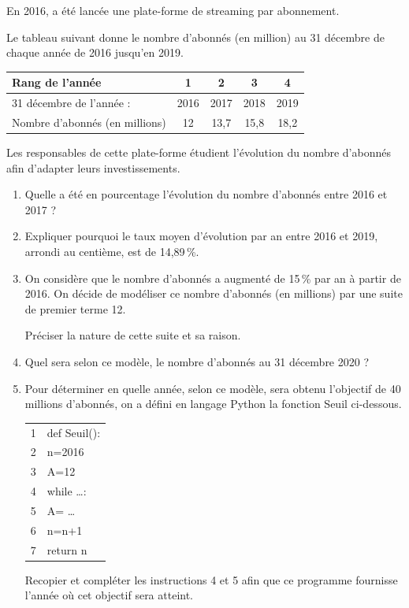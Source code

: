 \medskip

En 2016, a été lancée une plate-forme de streaming par abonnement.

Le tableau suivant donne le nombre d'abonnés (en million) au 31 décembre de
chaque année de 2016 jusqu'en 2019.
\begin{center}
\begin{tabular}[]{|m{4.85cm}|*{4}{c|}}
\hline
Rang de l'année &1& 2& 3 &4\\\hline
31 décembre de l'année :& 2016& 2017& 2018& 2019\\\hline
Nombre d'abonnés (en millions) &12& 13,7& 15,8& 18,2\\ \hline
\end{tabular}
\end{center}

Les responsables de cette plate-forme étudient l'évolution du nombre d'abonnés afin
d'adapter leurs investissements.

\medskip

\begin{enumerate}
\item  Quelle a été en pourcentage l'évolution du nombre d'abonnés entre 2016 et
2017 ?
\item Expliquer pourquoi le taux moyen d'évolution par an entre 2016 et 2019,
arrondi au centième, est de 14,89\,\%.
\item On considère que le nombre d'abonnés a augmenté de 15\,\% par an à partir de
2016. On décide de modéliser ce nombre d'abonnés (en millions) par une
suite de premier terme 12.

Préciser la nature de cette suite et sa raison.
\item Quel sera selon ce modèle, le nombre d'abonnés au 31 décembre 2020 ?
\item Pour déterminer en quelle année, selon ce modèle, sera obtenu l'objectif de
40 millions d'abonnés, on a défini en langage Python la fonction Seuil ci-dessous.

\begin{center}
\begin{tabular}[]{|c|l|}
\hline
1& def Seuil():\\
2&  \hspace{1em}n=2016\\
3&  \hspace{1em}A=12\\
4&  \hspace{1em}while \ldots :\\
5&  \hspace{1em}\phantom{w}A= \dots\\
6&  \hspace{1em}\phantom{w}n=n+1\\
7&  \hspace{1em}return n\\
\hline
\end{tabular}
\end{center}
Recopier et compléter les instructions 4 et 5 afin que ce programme fournisse
l'année où cet objectif sera atteint.
\end{enumerate}
